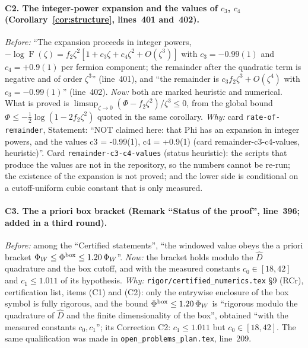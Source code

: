 \documentclass[11pt]{article}
\theoremstyle{accent}
\theoremstyle{definition}
\newcommand{\Fid}{\operatorname{F}}
\begin{document}
{\paragraph{C2. The integer-power expansion and the values of $c_3$, $c_4$ (Corollary~\ref{cor:structure},
lines~401 and~402).}
\emph{Before:} ``The expansion proceeds in integer powers,
$-\log\Fid(\zeta)=f_2\zeta^2[1+c_3\zeta+c_4\zeta^2+O(\zeta^3)]$ with $c_3=-0.99(1)$ and
$c_4=+0.9(1)$ per fermion component; the remainder after the quadratic term is negative and of order
$\zeta^3$'' (line~401), and ``the remainder is $c_3f_2\zeta^3+O(\zeta^4)$ with $c_3=-0.99(1)$''
(line~402).
\emph{Now:} both are marked heuristic and numerical.  What is proved is
$\limsup_{\zeta\to0}(\Phi-f_2\zeta^2)/\zeta^3\le0$, from the global bound
$\Phi\le-\frac12\log(1-2f_2\zeta^2)$ quoted in the same corollary.
\emph{Why:} card \texttt{rate-of-remainder}, Statement: ``NOT claimed here: that Phi has an
expansion in integer powers, and the values c3 = -0.99(1), c4 = +0.9(1) (card
remainder-c3-c4-values, heuristic)''.  Card \texttt{remainder-c3-c4-values} (status heuristic): the
scripts that produce the values are not in the repository, so the numbers cannot be re-run; the
existence of the expansion is not proved; and the lower side is conditional on a cutoff-uniform
cubic constant that is only measured.
\paragraph{C3. The a priori box bracket (Remark ``Status of the proof'', line~396; added in a third
round).}
\emph{Before:} among the ``Certified statements'', ``the windowed value obeys the a priori bracket
$\Phi_W\le\Phi^{\rm box}\le1.20\,\Phi_W$''.
\emph{Now:} the bracket holds modulo the $\widehat D$ quadrature and the box cutoff, and with the
measured constants $c_0\in[18,42]$ and $c_1\le1.011$ of its hypothesis.
\emph{Why:} \texttt{rigor/certified\_numerics.tex} \S9 (RCr), certification list, items (C1) and
(C2): only the entrywise enclosure of the box symbol is fully rigorous, and the bound
$\Phi^{\rm box}\le1.20\,\Phi_W$ is ``rigorous modulo the quadrature of $\widehat D$ and the finite
dimensionality of the box'', obtained ``with the measured constants $c_0,c_1$''; its Correction C2:
$c_1\le1.011$ but $c_0\in[18,42]$.  The same qualification was made in \texttt{open\_problems\_plan.tex},
line~209.
}
\end{document}

